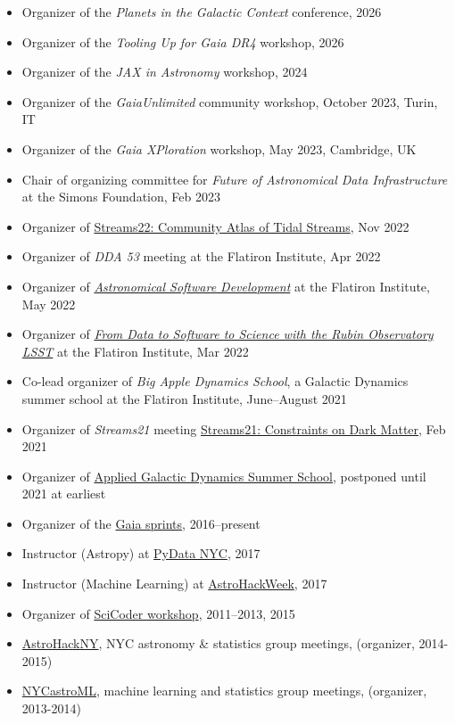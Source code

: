 \documentclass[12pt, letterpaper]{apw-cv}
\begin{document}
\begin{itemize}
    \item Organizer of the \emph{Planets in the Galactic Context} conference, 2026
    \item Organizer of the \emph{Tooling Up for Gaia DR4} workshop, 2026
    \item Organizer of the \emph{JAX in Astronomy} workshop, 2024
    \item Organizer of the \emph{GaiaUnlimited} community workshop, October 2023, Turin, IT
    \item Organizer of the \emph{Gaia XPloration} workshop, May 2023, Cambridge, UK
    \item Chair of organizing committee for \textit{Future of Astronomical Data Infrastructure} at the Simons Foundation, Feb 2023
    \item Organizer of \href{https://stellarstreams.org/streams22}{Streams22: Community Atlas of Tidal Streams}, Nov 2022
    \item Organizer of \textit{DDA 53} meeting at the Flatiron Institute, Apr 2022
    \item Organizer of \href{https://code.astrodata.nyc/}{\textit{Astronomical Software Development}} at the Flatiron Institute, May 2022
    \item Organizer of \href{https://indico.flatironinstitute.org/event/2777/}{\textit{From Data to Software to Science with the Rubin Observatory LSST}} at the Flatiron Institute, Mar 2022
    \item Co-lead organizer of \textit{Big Apple Dynamics School}, a Galactic Dynamics summer school at the Flatiron Institute, June--August 2021
    \item Organizer of \textit{Streams21} meeting \href{https://stellarstreams.org/streams21}{Streams21: Constraints on Dark Matter}, Feb 2021
    \item Organizer of \href{http://galacticdynamics.nyc/}{Applied Galactic Dynamics Summer School}, postponed until 2021 at earliest
    \item Organizer of the \href{http://gaia.lol}{Gaia sprints}, 2016--present
    \item Instructor (Astropy) at \href{http://pydata.org/nyc2017}{PyData NYC}, 2017
    \item Instructor (Machine Learning) at \href{http://astrohackweek.org}{AstroHackWeek}, 2017
    \item Organizer of \href{http://scicoder.org}{SciCoder workshop}, 2011--2013, 2015
    \item \href{https://groups.google.com/forum/#!forum/astrohackny}{AstroHackNY}, NYC astronomy \& statistics group meetings, (organizer, 2014-2015)
    \item \href{https://github.com/adrn/nycastroml}{NYCastroML}, machine learning and statistics group meetings, (organizer, 2013-2014)
\end{itemize}
\end{document}

